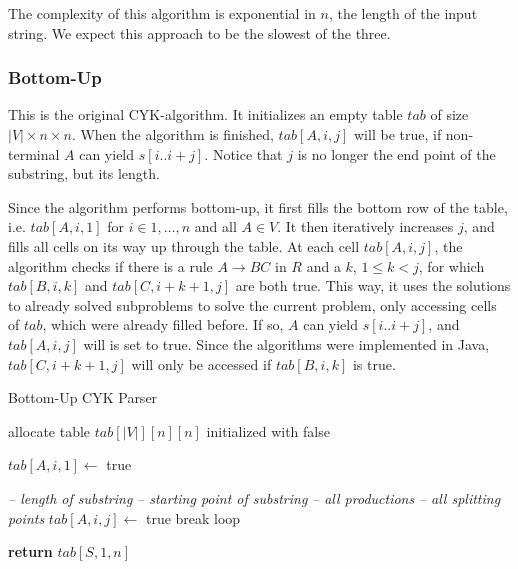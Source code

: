 The complexity of this algorithm is exponential in $n$, the length of the input string.
We expect this approach to be the slowest of the three.


\subsubsection{Bottom-Up}
This is the original CYK-algorithm.
It initializes an empty table $tab$ of size $|V|\times n\times n$.
When the algorithm is finished, $tab[A,i,j]$ will be true, if non-terminal $A$ can yield $s[i..i+j]$.
Notice that $j$ is no longer the end point of the substring, but its length.

Since the algorithm performs bottom-up, it first fills the bottom row of the table, i.e. $tab[A,i,1]$ for $i\in{1,\dots,n}$ and all $A\in V$.
It then iteratively increases $j$, and fills all cells on its way up through the table.
At each cell $tab[A,i,j]$, the algorithm checks if there is a rule $A\rightarrow BC$ in $R$ and a $k$, $1 \leq k < j$, for which $tab[B,i,k]$ and $tab[C,i+k+1, j]$ are both true.
This way, it uses the solutions to already solved subproblems to solve the current problem, only accessing cells of $tab$, which were already filled before.
If so, $A$ can yield $s[i..i+j]$, and $tab[A,i,j]$ will is set to true.
Since the algorithms were implemented in Java, $tab[C,i+k+1, j]$ will only be accessed if $tab[B,i,k]$ is true.


\begin{algorithm}[H]
    \caption{Bottom-Up CYK Parser}
    \label{alg:bu}
    \begin{algorithmic}[1]
        \State allocate table $tab[|V|][n][n]$ initialized with false
    
                \State $tab[A,i,1] \leftarrow$ true
            \EndFor
        \EndFor

         \hspace*{2.75cm}\textit{-- length of substring}
             \hspace*{1cm}\textit{-- starting point of substring}
                 \hspace*{1cm}\textit{-- all productions}
                     \hspace*{0.5cm}\textit{-- all splitting points}
                            \State $tab[A,i,j]\leftarrow$ true
                            \State break loop
                        \EndIf
                    \EndFor
                \EndFor
            \EndFor
        \EndFor

        \State \textbf{return} $tab[S,1,n]$
        \EndProcedure
    \end{algorithmic}
\end{algorithm}

